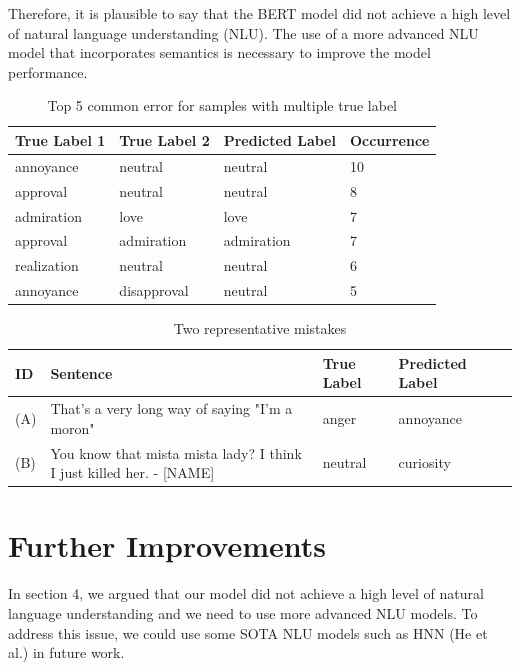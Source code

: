 \documentclass{article}
\begin{document}
Therefore, it is plausible to say that the BERT model did not achieve a high level of natural language understanding (NLU). The use of a more advanced NLU model that incorporates semantics is necessary to improve the model performance. 


\begin{table}[h!]
\renewcommand\thetable{5}
\caption{Top 5 common error for samples with multiple true label}
\centering
\begin{tabular}{l  l  l l}
\hline\hline
True Label 1& True Label 2&Predicted Label & Occurrence  \\ [0.5ex]
\hline 
annoyance & neutral  & neutral  & 10\\
approval& neutral  & neutral  & 8\\
admiration& love  & love  & 7\\
approval &admiration  & admiration  & 7\\
realization& neutral  & neutral  & 6\\
annoyance& disapproval  & neutral  & 5\\
[1ex]
\hline 
\end{tabular}
\label{table:nonlin} 
\end{table}

\begin{table}[h!]
\renewcommand\thetable{6}
\caption{Two representative mistakes}
\centering
\begin{tabular}{l  l  l l l} \hline \hline 
ID &Sentence & True Label& Predicted Label  \\ [0.5ex]
\hline
(A)& That's a very long way of saying "I'm a moron"  & anger  & annoyance\\[1ex]
(B) &You know that mista mista lady? I think I just killed her. - [NAME] & neutral  & curiosity\\[1ex]
\hline 
\end{tabular}
\label{table:nonlin} 
\end{table}






\section{Further Improvements}
In section 4, we argued that our model did not achieve a high level of natural language understanding and we need to use more advanced NLU models. To address this issue, we could use some SOTA NLU models such as HNN (He et al.) \cite{HNN} in future work. 
\end{document}
